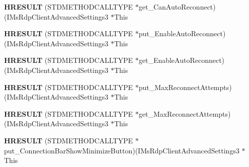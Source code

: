 \begin{DoxyCompactItemize}
\item 
\mbox{\label{struct_i_ms_rdp_client_advanced_settings3_vtbl_a5b791778bf155a681ac4859bd3177809}} 
{\bfseries H\+R\+E\+S\+U\+LT} (S\+T\+D\+M\+E\+T\+H\+O\+D\+C\+A\+L\+L\+T\+Y\+PE $\ast$get\+\_\+\+Can\+Auto\+Reconnect)(I\+Ms\+Rdp\+Client\+Advanced\+Settings3 $\ast$This
\item 
\mbox{\label{struct_i_ms_rdp_client_advanced_settings3_vtbl_aa815853f71da71d87f63089b7d4b818b}} 
{\bfseries H\+R\+E\+S\+U\+LT} (S\+T\+D\+M\+E\+T\+H\+O\+D\+C\+A\+L\+L\+T\+Y\+PE $\ast$put\+\_\+\+Enable\+Auto\+Reconnect)(I\+Ms\+Rdp\+Client\+Advanced\+Settings3 $\ast$This
\item 
\mbox{\label{struct_i_ms_rdp_client_advanced_settings3_vtbl_adcd40760b42ffe508e74c2eafc1cea19}} 
{\bfseries H\+R\+E\+S\+U\+LT} (S\+T\+D\+M\+E\+T\+H\+O\+D\+C\+A\+L\+L\+T\+Y\+PE $\ast$get\+\_\+\+Enable\+Auto\+Reconnect)(I\+Ms\+Rdp\+Client\+Advanced\+Settings3 $\ast$This
\item 
\mbox{\label{struct_i_ms_rdp_client_advanced_settings3_vtbl_aa98e70aaaae11ca7bdbbaf715d667053}} 
{\bfseries H\+R\+E\+S\+U\+LT} (S\+T\+D\+M\+E\+T\+H\+O\+D\+C\+A\+L\+L\+T\+Y\+PE $\ast$put\+\_\+\+Max\+Reconnect\+Attempts)(I\+Ms\+Rdp\+Client\+Advanced\+Settings3 $\ast$This
\item 
\mbox{\label{struct_i_ms_rdp_client_advanced_settings3_vtbl_af394a6e2570da54c620a3c92687615e2}} 
{\bfseries H\+R\+E\+S\+U\+LT} (S\+T\+D\+M\+E\+T\+H\+O\+D\+C\+A\+L\+L\+T\+Y\+PE $\ast$get\+\_\+\+Max\+Reconnect\+Attempts)(I\+Ms\+Rdp\+Client\+Advanced\+Settings3 $\ast$This
\item 
\mbox{\label{struct_i_ms_rdp_client_advanced_settings3_vtbl_a37466ad445c3b910f4deda3d12eb7af1}} 
{\bfseries H\+R\+E\+S\+U\+LT} (S\+T\+D\+M\+E\+T\+H\+O\+D\+C\+A\+L\+L\+T\+Y\+PE $\ast$put\+\_\+\+Connection\+Bar\+Show\+Minimize\+Button)(I\+Ms\+Rdp\+Client\+Advanced\+Settings3 $\ast$This
\item 
\mbox{\label{struct_i_ms_rdp_client_advanced_settings3_vtbl_ac48f96ee6e04ab2b1742db7e08918844}} 

\end{DoxyCompactItemize}
